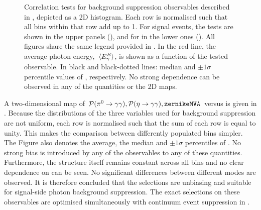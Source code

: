 \begin{figure}[htbp!]
{    }
    \caption{\label{fig:selection_correlations} Correlation tests for background suppression observables described in , depicted as a 2D histogram.
    Each row is normalised such that all bins within that row add up to 1.
    For signal \BptoXsgamma events, the tests are shown
    in the upper panels (),
    and for \BztoXsgamma in the lower ones ().
    All figures share the same legend provided in .
    In the red line, the average photon energy, $\expval**{{E^B_{\gamma}}}$, is shown as a function of the tested observable.
    In black and black-dotted lines: median and $\pm 1 \sigma$ percentile values of \EB, respectively.
    No strong dependence can be observed in any of the quantities or the 2D maps.
    }
\end{figure}

A two-dimensional map of ${{\mathcal{P}(\pi^0\rightarrow\gamma\gamma)},{\mathcal{P}(\eta\rightarrow\gamma\gamma)},{\texttt{zernikeMVA}}}$ versus \EB is given in .
Because the distributions of the three variables used for background suppression are not uniform, each row is normalised such that the sum of each row is equal to unity.
This makes the comparison between differently populated bins simpler.
The Figure also denotes the average, the median and $\pm 1\sigma$ percentiles of \EB.
No strong bias is introduced by any of the observables to any of these quantities.
Furthermore, the structure itself remains constant across all bins and no clear dependence on \EB can be seen.
No significant differences between different \FEI modes are observed.
It is therefore concluded that the selections are unbiasing and suitable for signal-side photon background suppression.
The exact selections on these observables are optimised simultaneously with continuum event suppression in .